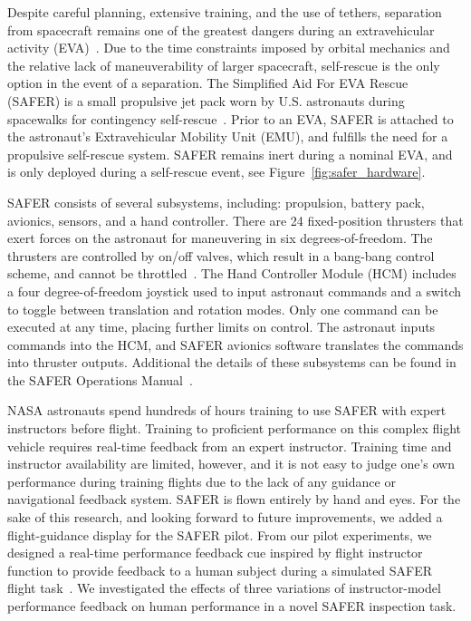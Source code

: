\documentclass[]{aiaa-tc}%
\begin{document}
Despite careful planning, extensive training, and the use of tethers, separation from spacecraft remains one of the greatest dangers during an extravehicular activity (EVA)~\cite{handley2014pilot}. Due to the time constraints imposed by orbital mechanics and the relative lack of maneuverability of larger spacecraft, self-rescue is the only option in the event of a separation. The Simplified Aid For EVA Rescue (SAFER) is a small propulsive jet pack worn by U.S. astronauts during spacewalks for contingency self-rescue~\cite{safer}. Prior to an EVA, SAFER is attached to the astronaut's Extravehicular Mobility Unit (EMU), and fulfills the need for a propulsive self-rescue system. SAFER remains inert during a nominal EVA, and is only deployed during a self-rescue event, see Figure~\ref{fig:safer_hardware}.

SAFER consists of several subsystems, including: propulsion, battery pack, avionics, sensors, and a hand controller. There are 24 fixed-position thrusters that exert forces on the astronaut for maneuvering in six degrees-of-freedom. The thrusters are controlled by on/off valves, which result in a bang-bang control scheme, and cannot be throttled~\cite{handley2014pilot}. The Hand Controller Module (HCM) includes a four degree-of-freedom joystick used to input astronaut commands and a switch to toggle between translation and rotation modes. Only one command can be executed at any time, placing further limits on control. The astronaut inputs commands into the HCM, and SAFER avionics software translates the commands into thruster outputs. Additional the details of these subsystems can be found in the SAFER Operations Manual~\cite{safer}.

NASA astronauts spend hundreds of hours training to use SAFER with expert instructors before flight. Training to proficient performance on this complex flight vehicle requires real-time feedback from an expert instructor. Training time and instructor availability are limited, however, and it is not easy to judge one's own performance during training flights due to the lack of any guidance or navigational feedback system. SAFER is flown entirely by hand and eyes. For the sake of this research, and looking forward to future improvements, we added a flight-guidance display for the SAFER pilot. From our pilot experiments, we designed a real-time performance feedback cue inspired by flight instructor function to provide feedback to a human subject during a simulated SAFER flight task~\cite{karasinski2016development}. We investigated the effects of three variations of instructor-model performance feedback on human performance in a novel SAFER inspection task.
\end{document}
